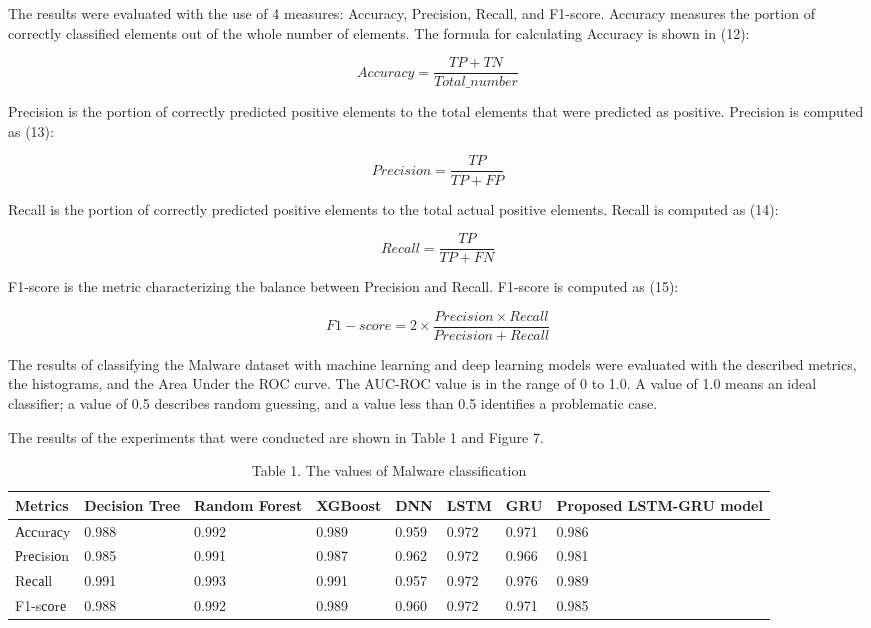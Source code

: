 The results were evaluated with the use of 4 measures: Accuracy,
Precision, Recall, and F1-score. Accuracy measures the portion of
correctly classified elements out of the whole number of elements. The
formula for calculating Accuracy is shown in (12):

\begin{equation}
Accuracy=\frac{TP+TN}{Total \text{\_} number}
\end{equation}

Precision is the portion of correctly predicted positive elements to the
total elements that were predicted as positive. Precision is computed as
(13):

\begin{equation}
Precision=\frac{TP}{TP+FP}
\end{equation}

Recall is the portion of correctly predicted positive elements to the
total actual positive elements. Recall is computed as (14):

\begin{equation}
Recall=\frac{TP}{TP+FN}
\end{equation}

F1-score is the metric characterizing the balance between Precision and
Recall. F1-score is computed as (15):

\begin{equation}
F1- score =2\times\frac{Precision \times Recall}{Precision + Recall}
\end{equation}

The results of classifying the Malware dataset with machine learning and
deep learning models were evaluated with the described metrics, the
histograms, and the Area Under the ROC curve. The AUC-ROC value is in
the range of 0 to 1.0. A value of 1.0 means an ideal classifier; a value
of 0.5 describes random guessing, and a value less than 0.5 identifies a
problematic case.

The results of the experiments that were conducted are shown in Table 1
and Figure 7.

\begin{table}[H]
\caption*{Table 1. The values of Malware classification}
\centering
\begin{tabular}{|l|l|l|l|l|l|l|l|}
\hline
Metrics   & Decision Tree & Random Forest & XGBoost & DNN   & LSTM  & GRU   & \multirow{1}{2cm}{Proposed LSTM-GRU model} \\ \hline
Ассurасy  & 0.988         & 0.992         & 0.989   & 0.959 & 0.972 & 0.971 & 0.986                   \\ \hline
Рrесisiоn & 0.985         & 0.991         & 0.987   & 0.962 & 0.972 & 0.966 & 0.981                   \\ \hline
Rесаll    & 0.991         & 0.993         & 0.991   & 0.957 & 0.972 & 0.976 & 0.989                   \\ \hline
F1-sсоrе  & 0.988         & 0.992         & 0.989   & 0.960 & 0.972 & 0.971 & 0.985                   \\ \hline
\end{tabular}
\end{table}

